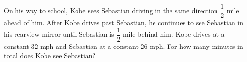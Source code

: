 On his way to school, Kobe sees Sebastian driving in the same direction $\dfrac{1}{2}$ mile ahead of him. After Kobe drives past Sebastian, he continues to see Sebastian in his rearview mirror until Sebastian is $\dfrac{1}{2}$ mile behind him. Kobe drives at a constant $32$ mph and Sebastian at a constant $26$ mph. For how many minutes in total does Kobe see Sebastian?
